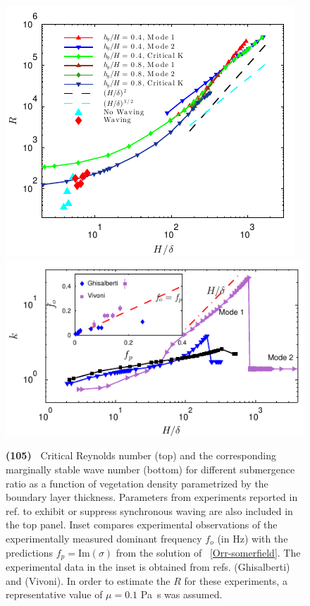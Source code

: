 \documentclass[aps,prl,reprint,twocolumn,superscriptaddress,sort&compress,10pt]{revtex4-1}  %
\newcommand{\Rey}{{R}}
\newcommand{\words}[1]{\textbf{(#1)~}}
\begin{document}
\begin{figure}
\begin{center}
\includegraphics[]{new_graph_R_vs_delta} \\
\vspace{-5mm} \hspace{-3mm}
\includegraphics[]{K_vs_shear_width_noshear}
\end{center}
\caption{
\words{105} Critical Reynolds number (top) and the corresponding marginally stable wave number (bottom) for different submergence ratio as a function of vegetation density parametrized by the boundary layer thickness. 
Parameters from experiments reported in ref. \cite{Ghisal02} to exhibit or suppress synchronous waving are also included in the top panel. 
Inset compares experimental observations of the experimentally measured dominant frequency $f_o$ (in Hz) with the predictions $f_p=\text{Im}(\sigma)$ from the solution of ~\eqref{Orr-somerfield}. 
The experimental data in the inset is obtained from refs. \cite{Ghisal02} (Ghisalberti) and \cite{Vivoni98} (Vivoni). 
In order to estimate the $\Rey$ for these experiments, a representative value of $\mu=0.1$ Pa~s was assumed.
}
\label{Re_vs_delta}
\end{figure}
\end{document}
